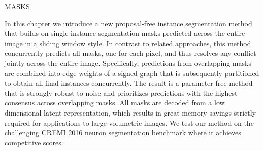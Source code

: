 MASKS

In this chapter we introduce a new proposal-free instance segmentation method that builds on single-instance segmentation masks predicted across the entire image in a sliding window style.
In contrast to related approaches, this method concurrently predicts all masks, one for each pixel, and thus resolves any conflict jointly across the entire image.
Specifically, predictions from overlapping masks are combined into edge weights of a signed graph that is subsequently partitioned to obtain all final instances concurrently.
The result is a parameter-free method that is strongly robust to noise and prioritizes predictions with the highest consensus across overlapping masks. 
All masks are decoded from a low dimensional latent representation, which results in great memory savings strictly required for applications to large volumetric images. 
We test our method on the challenging CREMI 2016 neuron segmentation benchmark where it achieves competitive scores. 

